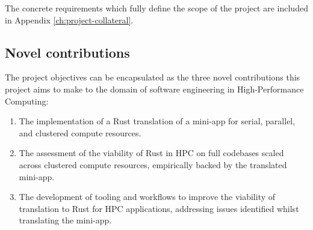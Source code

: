 The concrete requirements which fully define the scope of the project are included in Appendix \ref{ch:project-collateral}.

\subsection{Novel contributions}
\label{ssec:objectives-novel-contributions}

The project objectives can be encapsulated as the three novel contributions this project aims to make to the domain of software engineering in High-Performance Computing:

\begin{enumerate}
    \item The implementation of a Rust translation of a mini-app for serial, parallel, and clustered compute resources.
    \item The assessment of the viability of Rust in HPC on full codebases scaled across clustered compute resources, empirically backed by the translated mini-app.
    \item The development of tooling and workflows to improve the viability of translation to Rust for HPC applications, addressing issues identified whilst translating the mini-app.
\end{enumerate}
